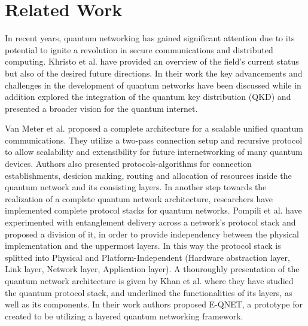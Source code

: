 \documentclass[12pt,a4paper] {report}
\begin{document}
\chapter{Related Work}
		In recent years, quantum networking has gained
		significant attention due to its potential to ignite a revolution in
		secure communications and distributed computing.
		Khristo et al. \cite{Khristo2020} have provided an overview of the field's
		current status but also of the desired future directions.
		In their work the key advancements and challenges in the
		development of quantum networks have been discussed while in addition
		explored the integration of the quantum key distribution (QKD)
		and presented a broader vision for the quantum internet.
	
		Van Meter et al. \cite{quantum-arch} proposed a complete architecture 
		for a scalable unified quantum communications. They utilize a two-pass connection setup and recursive protocol
		to allow scalability and extensibility for future internetworking
		of many quantum devices. Authors also presented protocols-algorithms for connection establishments, desicion making, routing and 
		allocation of resources inside the quantum network and its consisting layers.
		In another step towards the realization of a complete quantum network architecture,
		researchers have implemented complete protocol stacks for quantum networks.
		Pompili et al. \cite{pompilli} have experimented with entanglement delivery across 
		a network's protocol stack and proposed a division of it, in order to provide 
		independency between the physical implementation and the uppermost layers. 
		In this way the protocol stack is splitted into Physical and Platform-Independent
		(Hardware abstraction layer, Link layer, Network layer, Application layer).
		A thouroughly presentation of the quantum network architecture is given by Khan et al. \cite{e-qnet}
		where they have studied the quantum protocol stack, and underlined the functionalities of its layers, as well 
		as its components. In their work authors proposed E-QNET, a prototype for  created to be utilizing a layered quantum networking
		framework.
\end{document}
